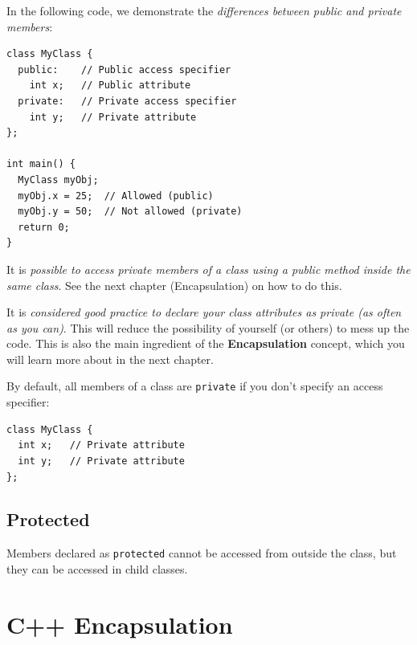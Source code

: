 \documentclass[../basic_programs.tex]{subfiles}
\begin{document}
    \begin{exa}
        In the following code, we demonstrate the \textit{differences between public and private members}:        
        \begin{lstlisting}[caption={caption},label=DescriptiveLabel]
class MyClass {
  public:    // Public access specifier
    int x;   // Public attribute
  private:   // Private access specifier
    int y;   // Private attribute
};

int main() {
  MyClass myObj;
  myObj.x = 25;  // Allowed (public)
  myObj.y = 50;  // Not allowed (private)
  return 0;
}
        \end{lstlisting}
    \end{exa}

    \begin{obs}
        It is \textit{possible to access private members of a class using a public method inside the same class}. See the next chapter (Encapsulation) on how to do this.
    \end{obs}

    \begin{idea}
        It is \textit{considered good practice to declare your class attributes as private (as often as you can)}. This will reduce the possibility of yourself (or others) to mess up the code. This is also the main ingredient of the \textbf{Encapsulation} concept, which you will learn more about in the next chapter.
    \end{idea}

    By default, all members of a class are \lstinline|private| if you don't specify an access specifier:
    \begin{lstlisting}[caption={caption},label=DescriptiveLabel]
class MyClass {
  int x;   // Private attribute
  int y;   // Private attribute
};
    \end{lstlisting}
  
    \subsection{Protected}

    Members declared as \lstinline|protected| cannot be accessed from outside the class, but they can be accessed in child classes.

    \section{C++ Encapsulation}
\end{document}
